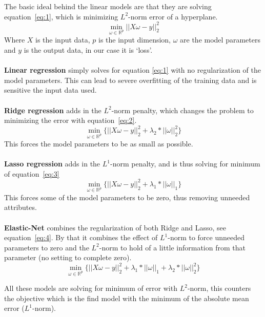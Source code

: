 \documentclass[a4paper]{article}
\begin{document}
The basic ideal behind the linear models are that they are solving equation~\ref{eq:1}, which is minimizing $L^2$-norm error of a hyperplane.
\begin{equation} \label{eq:1}
\min_{\omega\in\mathbb{R}^p}||X\omega - y||_2^2
\end{equation}
Where $X$ is the input data, $p$ is the input dimension, $\omega$ are the model parameters and $y$ is the output data, in our case it is ‘loss’. \\\\
\textbf{Linear regression} simply solves for equation \ref{eq:1} with no regularization of the model parameters. This can lead to severe overfitting of the training data and is sensitive the input data used. \\\\
\textbf{Ridge regression} adds in the $L^2$-norm penalty, which changes the problem to minimizing the error with equation~\ref{eq:2}.
\begin{equation} \label{eq:2}
\min_{\omega\in\mathbb{R}^p} \{||X\omega - y||_2^2 + \lambda_2*||\omega||_2^2 \}
\end{equation}
This forces the model parameters to be as small as possible.\\\\
\textbf{Lasso regression} adds in the $L^1$-norm penalty, and is thus solving for minimum of equation~\ref{eq:3}
\begin{equation} \label{eq:3}
\min_{\omega\in\mathbb{R}^p}  \{||X\omega - y||_2^2 + \lambda_1*||\omega||_1\}
\end{equation}
This forces some of the model parameters to be zero, thus removing unneeded attributes. \\\\
\textbf{Elastic-Net} combines the regularization of both Ridge and Lasso, see equation~\ref{eq:4}. By that it combines the effect of $L^1$-norm to force unneeded parameters to zero and the $L^2$-norm to hold of a little information from that parameter (no setting to complete zero).
\begin{equation} \label{eq:4}
\min_{\omega\in\mathbb{R}^p}  \{||X\omega - y||_2^2 + \lambda_1*||\omega||_1 + \lambda_2*||\omega||_2^2\}
\end{equation}

All these models are solving for minimum of error with $L^2$-norm, this counters the objective which is the find model with the minimum of the absolute mean error ($L^1$-norm).
\end{document}
